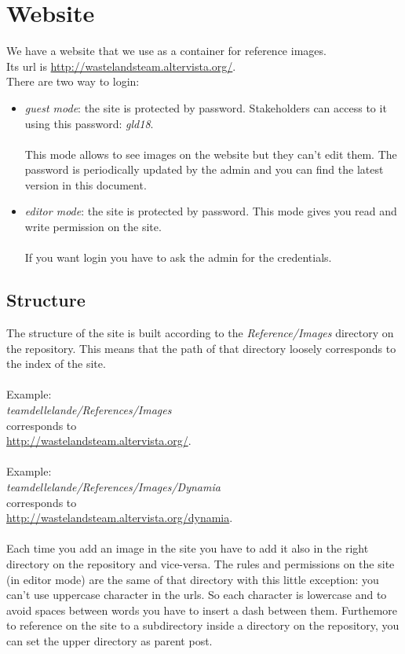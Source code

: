 \section{Website}
We have a website that we use as a container for reference images. \\Its url is \href{http://wastelandsteam.altervista.org/}{http://wastelandsteam.altervista.org/}.\\

There are two way to login: 
\begin{itemize}
\item \textit{guest mode}: the site is protected by password. Stakeholders can access to it using this password: \textit{gld18}.\\\\
  This mode allows to see images on the website but they can't edit them. The password is periodically updated by the admin and you can find the latest version in this document.
\item \textit{editor mode}: the site is protected by password. This mode gives you read and write permission on the site.\\\\
  If you want login you have to ask the admin for the credentials.
\end{itemize}

\subsection{Structure}
The structure of the site is built according to the \textit{Reference/Images} directory on the repository.
This means that the path of that directory loosely corresponds to the index of the site.\\\\
Example: \\
\textit{teamdellelande/References/Images} \\corresponds to\\ \href{http://wastelandsteam.altervista.org/}{http://wastelandsteam.altervista.org/}.\\\\
Example: \\
\textit{teamdellelande/References/Images/Dynamia} \\corresponds to\\ \href{http://wastelandsteam.altervista.org/dynamia}{http://wastelandsteam.altervista.org/dynamia}.\\\\
Each time you add an image in the site you have to add it also in the right directory on the repository and vice-versa.
The rules and permissions on the site (in editor mode) are the same of that directory with this little exception:
you can't use uppercase character in the urls. So each character is lowercase and to avoid spaces between words you have to insert a dash between them. Furthemore to reference on the site to a subdirectory inside a directory on the repository, you can set the upper directory as parent post.
